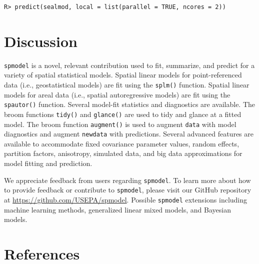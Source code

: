 \documentclass{article}
\begin{document}
\begin{verbatim}
R> predict(sealmod, local = list(parallel = TRUE, ncores = 2))
\end{verbatim}

\hypertarget{sec:discussion}{%
\section{Discussion}\label{sec:discussion}}

\texttt{spmodel} is a novel, relevant contribution used to fit,
summarize, and predict for a variety of spatial statistical models.
Spatial linear models for point-referenced data (i.e., geostatistical
models) are fit using the \texttt{splm()} function. Spatial linear
models for areal data (i.e., spatial autoregressive models) are fit
using the \texttt{spautor()} function. Several model-fit statistics and
diagnostics are available. The broom functions \texttt{tidy()} and
\texttt{glance()} are used to tidy and glance at a fitted model. The
broom function \texttt{augment()} is used to augment \texttt{data} with
model diagnostics and augment \texttt{newdata} with predictions. Several
advanced features are available to accommodate fixed covariance
parameter values, random effects, partition factors, anisotropy,
simulated data, and big data approximations for model fitting and
prediction.

We appreciate feedback from users regarding \texttt{spmodel}. To learn
more about how to provide feedback or contribute to \texttt{spmodel},
please visit our GitHub repository at
\url{https://github.com/USEPA/spmodel}. Possible \texttt{spmodel}
extensions including machine learning methods, generalized linear mixed
models, and Bayesian models.

\hypertarget{references}{%
\section*{References}\label{references}}
\end{document}
